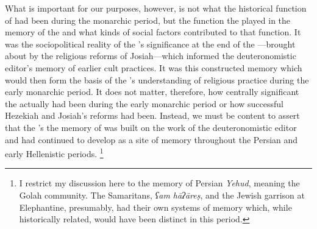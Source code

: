 What is important for our purposes, however, is not what the historical function of \thetemple had been during the monarchic period, but the function the \jerusalemtemple played in the memory of the \chronicler and what kinds of social factors contributed to that function. It was the sociopolitical reality of the \jerusalemtemple's significance at the end of the ---brought about by the religious reforms of Josiah---which informed the deuteronomistic editor's memory of earlier \yahwistic cult practices. It was this constructed memory which would then form the basis of the \chronicler's understanding of religious practice during the early monarchic period. It does not matter, therefore, how centrally significant the \jerusalemtemple actually had been during the early monarchic period or how successful Hezekiah and Josiah's reforms had been. Instead, we must be content to assert that the \chronicler's the memory of \thetemple was built on the work of the deuteronomistic editor and had continued to develop as a site of memory throughout the Persian and early Hellenistic periods.%
    \footnote{I restrict my discussion here to the memory of Persian \emph{Yehud}, meaning the Golah community. The Samaritans, \emph{ʕam hāʔāreṣ}, and the Jewish garrison at Elephantine, presumably, had their own systems of memory which, while historically related, would have been distinct in this period.}

